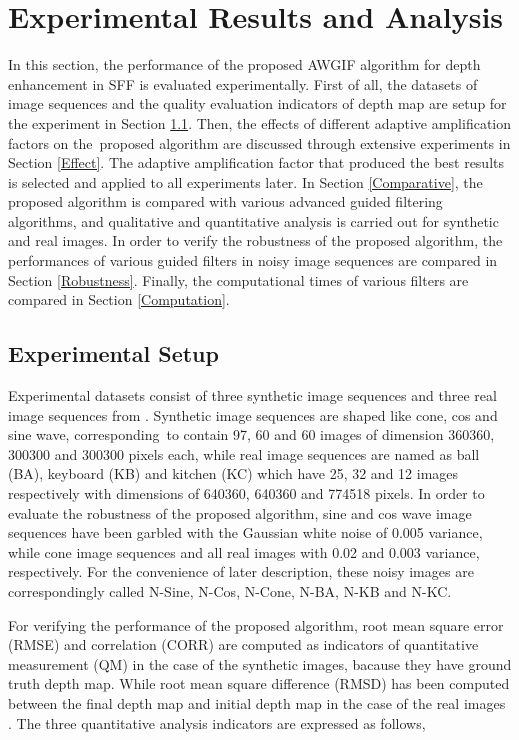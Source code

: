 \documentclass[a4paper,fleqn]{cas-dc}
\begin{document}
\section{Experimental Results and Analysis}\label{Experiment}
In this section, the performance of the proposed AWGIF algorithm for depth enhancement in SFF is evaluated experimentally. First of all, the datasets of image sequences and the quality evaluation indicators of depth map are setup for the experiment in Section \ref{Setup}. Then, the effects of different adaptive amplification factors on the proposed algorithm are discussed through extensive experiments in Section \ref{Effect}. The adaptive amplification factor that produced the best results is selected and applied to all experiments later. In Section \ref{Comparative}, the proposed algorithm is compared with various advanced guided filtering algorithms, and qualitative and quantitative analysis is carried out for synthetic and real images. In order to verify the robustness of the proposed algorithm, the performances of various guided filters in noisy image sequences are compared in Section \ref{Robustness}. Finally, the computational times of various filters are compared in Section \ref{Computation}.

\subsection{Experimental Setup}\label{Setup}
Experimental datasets consist of three synthetic image sequences and three real image sequences from \cite{mahmood2012nonlinear,suwajanakorn2015depth}. Synthetic image sequences are shaped like cone, cos and sine wave, corresponding to contain 97, 60 and 60 images of dimension 360360, 300300 and 300300 pixels each, while real image sequences are named as ball (BA), keyboard (KB) and kitchen (KC) which have 25, 32 and 12 images respectively with dimensions of 640360, 640360 and 774518 pixels. In order to evaluate the robustness of the proposed algorithm, sine and cos wave image sequences have been garbled with the Gaussian white noise of 0.005 variance, while cone image sequences and all real images with 0.02 and 0.003 variance, respectively. For the convenience of later description, these noisy images are correspondingly called N-Sine, N-Cos, N-Cone, N-BA, N-KB and N-KC.   

For verifying the performance of the proposed algorithm, root mean square error (RMSE) and correlation (CORR) are computed as indicators of quantitative measurement (QM) in the case of the synthetic images, bacause they have ground truth depth map. While root mean square difference (RMSD) has been computed between the final depth map and initial depth map in the case of the real images \cite{ali2021guided}. The three quantitative analysis indicators are expressed as follows,
\end{document}
